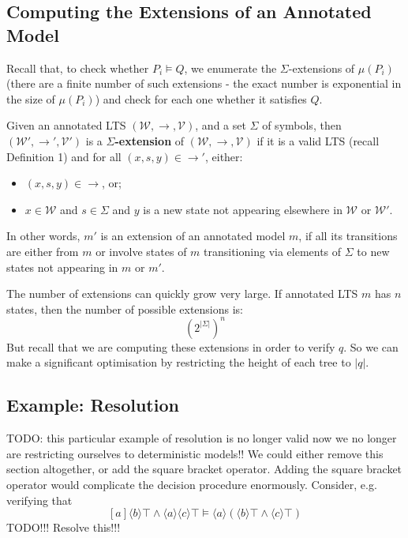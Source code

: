 \subsection{Computing the Extensions of an Annotated Model}

Recall that, to check whether $P_i \models Q$, we enumerate the $\Sigma$-extensions of $\mu(P_i)$ (there are a finite number of such extensions - the exact number is exponential in the size of $\mu(P_i)$) and check for each one whether it satisfies $Q$.

\begin{definition}
Given an annotated LTS $(\mathcal{W},\rightarrow,\mathcal{V})$,  and a set $\Sigma$ of symbols, then $(\mathcal{W'},\rightarrow',\mathcal{V'})$ is a {\bf $\Sigma$-extension} of $(\mathcal{W},\rightarrow,\mathcal{V})$ if it is a valid LTS (recall Definition 1) and for all $(x,s,y) \in \rightarrow'$, either:
\begin{itemize} 
\item
$(x, s, y) \in \rightarrow$,  or;
\item
 $x \in \mathcal{W}$ and $s \in \Sigma$ and $y$ is a new state not appearing elsewhere in $\mathcal{W}$ or $\mathcal{W'}$.
\end{itemize}
\end{definition}
In other words, $m'$ is an extension of an annotated model $m$, if all its transitions are either from $m$ or involve states of $m$ transitioning via elements of $\Sigma$ to new states not appearing in $m$ or $m'$.

The number of extensions can quickly grow very large.
If annotated LTS $m$ has $n$ states, then the number of possible extensions is:
\[
({2^{|\Sigma|}})^n
\] 
But recall that we are computing these extensions in order to verify $q$. So we can make a significant optimisation by restricting the height of each tree to $|q|$.

\subsection{Example: Resolution}
TODO: this particular example of resolution is no longer valid now we no longer are restricting ourselves to deterministic models!!
We could either remove this section altogether, or add the square bracket operator. 
Adding the square bracket operator would complicate the decision procedure enormously.
Consider, e.g. verifying that 
\[
[a] \langle b \rangle \top \land \langle a \rangle \langle c \rangle \top \models \langle a \rangle (\langle b \rangle \top \land \langle c \rangle \top)
\]
TODO!!! Resolve this!!!

